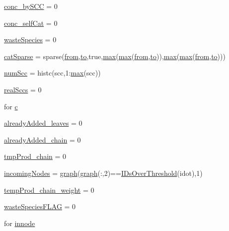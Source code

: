 \begin{DoxyCompactItemize}
\item 
\hyperlink{a00028_a5884b552ac8657e68e86a84f3d6c173a}{conc\+\_\+by\+S\+C\+C} = 0
\item 
\hyperlink{a00028_a2a45c56ac35d4906cc4a8363b98b1caa}{conc\+\_\+self\+Cat} = 0
\item 
\hyperlink{a00028_a4648745d0256487cb11cb5235f3b9be3}{waste\+Species} = 0
\item 
\hyperlink{a00028_af1693f05ef323ea183b39bc85226c0a8}{cat\+Sparse} = sparse(\hyperlink{a00028_aa7b4fe13e75a69fca72862effeaf6196}{from},\hyperlink{a00028_af71dbe52628a3f83a77ab494817525c6}{to},true,\hyperlink{a00104_a6d9c24e62aee61f54530163edf684ae2}{max}(\hyperlink{a00104_a6d9c24e62aee61f54530163edf684ae2}{max}(\hyperlink{a00028_aa7b4fe13e75a69fca72862effeaf6196}{from},\hyperlink{a00028_af71dbe52628a3f83a77ab494817525c6}{to})),\hyperlink{a00104_a6d9c24e62aee61f54530163edf684ae2}{max}(\hyperlink{a00104_a6d9c24e62aee61f54530163edf684ae2}{max}(\hyperlink{a00028_aa7b4fe13e75a69fca72862effeaf6196}{from},\hyperlink{a00028_af71dbe52628a3f83a77ab494817525c6}{to})))
\item 
\hyperlink{a00028_a0d0db21d4520f7561ff56e2c80e4fb69}{num\+Scc} = histc(scc,1\+:\hyperlink{a00104_a6d9c24e62aee61f54530163edf684ae2}{max}(scc))
\item 
\hyperlink{a00028_a135a83e607075aa815c72f1ec0cbbc5a}{real\+Sccs} = 0
\item 
for \hyperlink{a00028_a0f16b7d4c8c225e06e6a8b2081508e64}{c}
\item 
\hyperlink{a00028_aabbdc56dad7f3314f69a712de710352c}{already\+Added\+\_\+leaves} = 0
\item 
\hyperlink{a00028_a1ddec545d7ccb86836f79e7f7e9ecb55}{already\+Added\+\_\+chain} = 0
\item 
\hyperlink{a00028_a80829d80ab721e79924274808616e45a}{tmp\+Prod\+\_\+chain} = 0
\item 
\hyperlink{a00028_a34c98e3306059653f2a214e5ef975e9c}{incoming\+Nodes} = \hyperlink{a00028_a2745e24fec2a44d51f4452beb1596bd3}{graph}(\hyperlink{a00028_a2745e24fec2a44d51f4452beb1596bd3}{graph}(\+:,2)==\hyperlink{a00028_a67c695f856b6731644c6a128e602a323}{I\+Ds\+Over\+Threshold}(idot),1)
\item 
\hyperlink{a00028_ab9ed4e2836783080230592e6bd20ef86}{temp\+Prod\+\_\+chain\+\_\+weight} = 0
\item 
\hyperlink{a00028_a86a34d23ef767cc82038231f868cea96}{waste\+Species\+F\+L\+A\+G} = 0
\item 
for \hyperlink{a00028_a21f06040cb68a910280e04d4c59d980e}{innode}

\end{DoxyCompactItemize}
